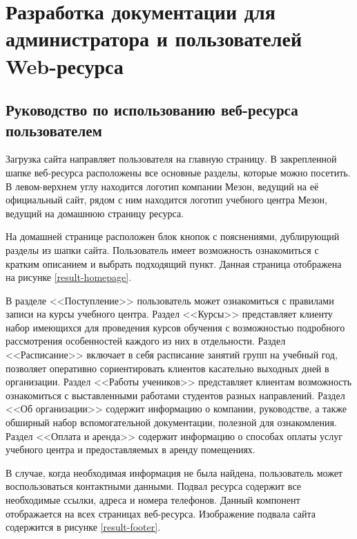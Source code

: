 \section{Разработка документации для администратора и пользователей Web-ресурса}

\subsection{Руководство по использованию веб-ресурса пользователем}

Загрузка сайта направляет пользователя на главную страницу.
В закрепленной шапке веб-ресурса расположены все основные разделы, которые можно посетить.
В левом-верхнем углу находится логотип компании Мезон, ведущий на её официальный сайт, рядом с ним находится логотип учебного центра Мезон, ведущий на домашнюю страницу ресурса.

На домашней странице расположен блок кнопок с пояснениями, дублирующий разделы из шапки сайта.
Пользователь имеет возможность ознакомиться с кратким описанием и выбрать подходящий пункт.
Данная страница отображена на рисунке \ref{result-homepage}.


В разделе <<Поступление>> пользователь может ознакомиться с правилами записи на курсы учебного центра.
Раздел <<Курсы>> представляет клиенту набор имеющихся для проведения курсов обучения с возможностью подробного рассмотрения особенностей каждого из них в отдельности.
Раздел <<Расписание>> включает в себя расписание занятий групп на учебный год, позволяет оперативно сориентировать клиентов касательно выходных дней в организации.
Раздел <<Работы учеников>> представляет клиентам возможность ознакомиться с выставленными работами студентов разных направлений.
Раздел <<Об организации>> содержит информацию о компании, руководстве, а также обширный набор вспомогательной документации, полезной для ознакомления.
Раздел <<Оплата и аренда>> содержит информацию о способах оплаты услуг учебного центра и предоставляемых в аренду помещениях.

В случае, когда необходимая информация не была найдена, пользователь может воспользоваться контактными данными.
Подвал ресурса содержит все необходимые ссылки, адреса и номера телефонов.
Данный компонент отображается на всех страницах веб-ресурса.
Изображение подвала сайта содержится в рисунке \ref{result-footer}.

